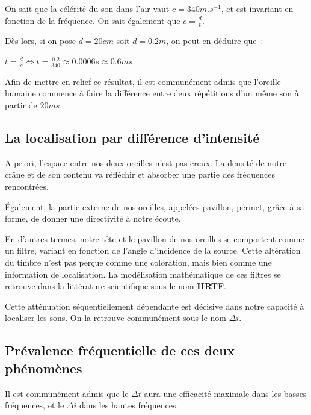 \documentclass[
]{book}
\begin{document}
On sait que la célérité du son dans l'air vaut \(c = 340 m.s^{-1}\), et est invariant en fonction de la fréquence. On sait également que \(c = \frac{d}{t}\).

Dès lors, si on pose \(d = 20 cm\) soit \(d = 0.2 m\), on peut en déduire que~:

\(t = \frac{d}{c} \iff t= \frac{0.2}{340} \approx 0.0006 s \approx 0.6 ms\)

Afin de mettre en relief ce résultat, il est communément admis que l'oreille humaine commence à faire la différence entre deux répétitions d'un même son à partir de \(20 ms\).

\hypertarget{la-localisation-par-diffuxe9rence-dintensituxe9}{%
\subsection{La localisation par différence d'intensité}\label{la-localisation-par-diffuxe9rence-dintensituxe9}}

A priori, l'espace entre nos deux oreilles n'est pas creux. La densité de notre crâne et de son contenu va réfléchir et absorber une partie des fréquences rencontrées.

Également, la partie externe de nos oreilles, appelées pavillon, permet, grâce à sa forme, de donner une directivité à notre écoute.

En d'autres termes, notre tête et le pavillon de nos oreilles se comportent comme un filtre, variant en fonction de l'angle d'incidence de la source. Cette altération du timbre n'est pas perçue comme une coloration, mais bien comme une information de localisation. La modélisation mathématique de ces filtres se retrouve dans la littérature scientifique sous le nom \textbf{HRTF}.

Cette atténuation séquentiellement dépendante est décisive dans notre capacité à localiser les sons. On la retrouve communément sous le nom \(\Delta i\).

\hypertarget{pruxe9valence-fruxe9quentielle-de-ces-deux-phuxe9nomuxe8nes}{%
\subsection{Prévalence fréquentielle de ces deux phénomènes}\label{pruxe9valence-fruxe9quentielle-de-ces-deux-phuxe9nomuxe8nes}}

Il est communément admis que le \(\Delta t\) aura une efficacité maximale dans les basses fréquences, et le \(\Delta i\) dans les hautes fréquences.
\end{document}
